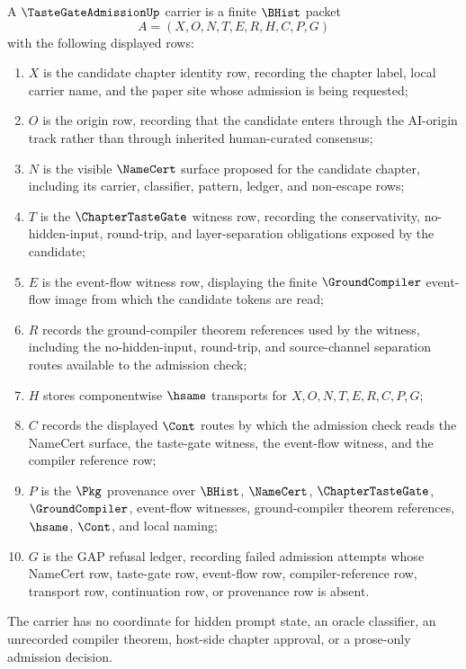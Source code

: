 \begin{definition}
\label{def:tastegate-admission-carrier}
A $\TasteGateAdmissionUp$ carrier is a finite $\BHist$ packet
$$
A=(X,O,N,T,E,R,H,C,P,G)
$$
with the following displayed rows:
\begin{enumerate}
\item $X$ is the candidate chapter identity row, recording the chapter label, local carrier name, and the paper site whose admission is being requested;
\item $O$ is the origin row, recording that the candidate enters through the AI-origin track rather than through inherited human-curated consensus;
\item $N$ is the visible $\NameCert$ surface proposed for the candidate chapter, including its carrier, classifier, pattern, ledger, and non-escape rows;
\item $T$ is the $\ChapterTasteGate$ witness row, recording the conservativity, no-hidden-input, round-trip, and layer-separation obligations exposed by the candidate;
\item $E$ is the event-flow witness row, displaying the finite $\GroundCompiler$ event-flow image from which the candidate tokens are read;
\item $R$ records the ground-compiler theorem references used by the witness, including the no-hidden-input, round-trip, and source-channel separation routes available to the admission check;
\item $H$ stores componentwise $\hsame$ transports for $X,O,N,T,E,R,C,P,G$;
\item $C$ records the displayed $\Cont$ routes by which the admission check reads the NameCert surface, the taste-gate witness, the event-flow witness, and the compiler reference row;
\item $P$ is the $\Pkg$ provenance over $\BHist$, $\NameCert$, $\ChapterTasteGate$, $\GroundCompiler$, event-flow witnesses, ground-compiler theorem references, $\hsame$, $\Cont$, and local naming;
\item $G$ is the GAP refusal ledger, recording failed admission attempts whose NameCert row, taste-gate row, event-flow row, compiler-reference row, transport row, continuation row, or provenance row is absent.
\end{enumerate}
The carrier has no coordinate for hidden prompt state, an oracle classifier, an unrecorded compiler theorem, host-side chapter approval, or a prose-only admission decision.
\end{definition}

